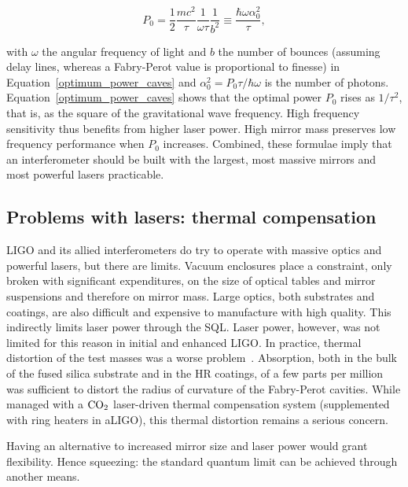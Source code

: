 \begin{equation}
P_0 = \frac{1}{2} \frac{mc^2}{\tau}\frac{1}{\omega \tau} \frac{1}{b^2} \equiv \frac{\hbar \omega \alpha_0^2}{\tau},
\label{optimum_power_caves}
\end{equation}

\noindent with $\omega$ the angular frequency of light and $b$ the number of bounces (assuming delay lines, whereas a Fabry-Perot value is proportional to finesse) in Equation~\ref{optimum_power_caves} and $\alpha_0^2 = P_0 \tau / \hbar \omega$ is the number of photons.
Equation~\ref{optimum_power_caves} shows that the optimal power $P_0$ rises as $1/\tau^2$, that is, as the square of the gravitational wave frequency.
High frequency sensitivity thus benefits from higher laser power.
High mirror mass preserves low frequency performance when $P_0$ increases.
Combined, these formulae imply that an interferometer should be built with the largest, most massive mirrors and most powerful lasers practicable.

        \subsection{Problems with lasers: thermal compensation}
        \label{TCS}


LIGO and its allied interferometers do try to operate with massive optics and powerful lasers, but there are limits.
Vacuum enclosures place a constraint, only broken with significant expenditures, on the size of optical tables and mirror suspensions and therefore on mirror mass.
Large optics, both substrates and coatings, are also difficult and expensive to manufacture with high quality.
This indirectly limits laser power through the SQL.
Laser power, however, was not limited for this reason in initial and enhanced LIGO.
In practice, thermal distortion of the test masses was a worse problem~\cite{BallmerThesis}.
Absorption, both in the bulk of the fused silica substrate and in the HR coatings, of a few parts per million was sufficient to distort the radius of curvature of the Fabry-Perot cavities.
While managed with a $\textup{CO}_2$ laser-driven thermal compensation system (supplemented with ring heaters in aLIGO), this thermal distortion remains a serious concern.

Having an alternative to increased mirror size and laser power would grant flexibility.
Hence squeezing: the standard quantum limit can be achieved through another means.


